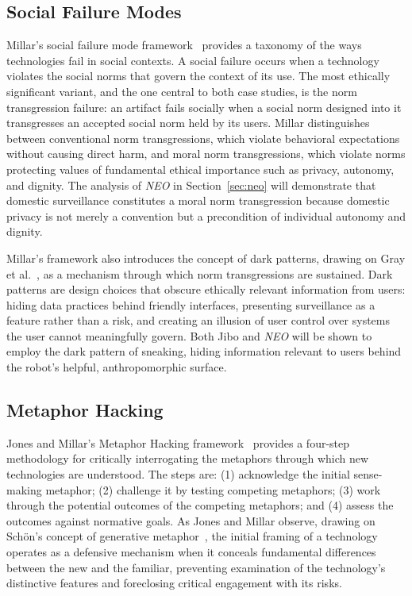 \documentclass{ieee-portfolio}
\newcommand{\neo}{\textit{NEO}}
\begin{document}
\subsection{Social Failure Modes}

Millar's social failure mode framework~\cite{millar_social_2020} provides a taxonomy of the ways technologies fail in social contexts. A social failure occurs when a technology violates the social norms that govern the context of its use. The most ethically significant variant, and the one central to both case studies, is the norm transgression failure: an artifact fails socially when a social norm designed into it transgresses an accepted social norm held by its users. Millar distinguishes between conventional norm transgressions, which violate behavioral expectations without causing direct harm, and moral norm transgressions, which violate norms protecting values of fundamental ethical importance such as privacy, autonomy, and dignity. The analysis of \neo{} in Section~\ref{sec:neo} will demonstrate that domestic surveillance constitutes a moral norm transgression because domestic privacy is not merely a convention but a precondition of individual autonomy and dignity.

Millar's framework also introduces the concept of dark patterns, drawing on Gray et al.~\cite{gray_dark_2018}, as a mechanism through which norm transgressions are sustained. Dark patterns are design choices that obscure ethically relevant information from users: hiding data practices behind friendly interfaces, presenting surveillance as a feature rather than a risk, and creating an illusion of user control over systems the user cannot meaningfully govern. Both Jibo and \neo{} will be shown to employ the dark pattern of sneaking, hiding information relevant to users behind the robot's helpful, anthropomorphic surface.

\subsection{Metaphor Hacking}

Jones and Millar's Metaphor Hacking framework~\cite{jones_hacking_2017} provides a four-step methodology for critically interrogating the metaphors through which new technologies are understood. The steps are: (1) acknowledge the initial sense-making metaphor; (2) challenge it by testing competing metaphors; (3) work through the potential outcomes of the competing metaphors; and (4) assess the outcomes against normative goals. As Jones and Millar observe, drawing on Sch\"{o}n's concept of generative metaphor~\cite{schon_generative_1993}, the initial framing of a technology operates as a defensive mechanism when it conceals fundamental differences between the new and the familiar, preventing examination of the technology's distinctive features and foreclosing critical engagement with its risks.
\end{document}
